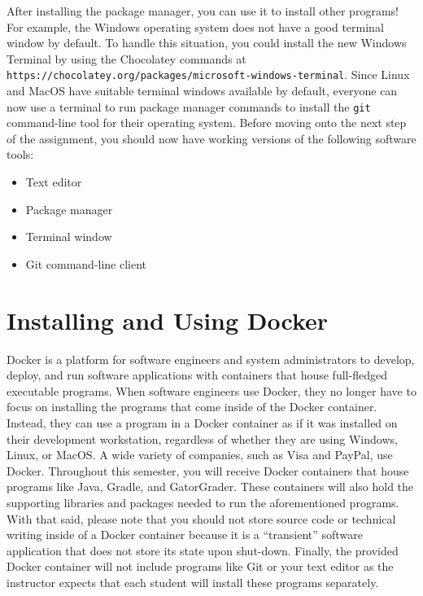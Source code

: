 \documentclass[11pt]{article}
\newcommand{\program}[1]{\lstinline{#1}}
\newcommand{\url}[1]{\lstinline{#1}}
\begin{document}
After installing the package manager, you can use it to install other programs!
For example, the Windows operating system does not have a good terminal window
by default. To handle this situation, you could install the new Windows Terminal
by using the Chocolatey commands at
\url{https://chocolatey.org/packages/microsoft-windows-terminal}. Since Linux
and MacOS have suitable terminal windows available by default, everyone can now
use a terminal to run package manager commands to install the \program{git}
command-line tool for their operating system. Before moving onto the next step
of the assignment, you should now have working versions of the following
software tools:

\begin{itemize}

  \item Text editor

  \item Package manager

  \item Terminal window

  \item Git command-line client

\end{itemize}

\section*{Installing and Using Docker}

Docker is a platform for software engineers and system administrators to
develop, deploy, and run software applications with containers that house
full-fledged executable programs. When software engineers use Docker, they no
longer have to focus on installing the programs that come inside of the Docker
container. Instead, they can use a program in a Docker container as if it was
installed on their development workstation, regardless of whether they are using
Windows, Linux, or MacOS. A wide variety of companies, such as Visa and PayPal,
use Docker. Throughout this semester, you will receive Docker containers that
house programs like Java, Gradle, and GatorGrader. These containers will also
hold the supporting libraries and packages needed to run the aforementioned
programs. With that said, please note that you should not store source code or
technical writing inside of a Docker container because it is a ``transient''
software application that does not store its state upon shut-down. Finally, the
provided Docker container will not include programs like Git or your text editor
as the instructor expects that each student will install these programs
separately.
\end{document}
